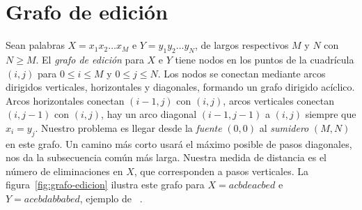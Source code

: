\section{Grafo de edición}
\label{sec:grafo-edicion}

  Sean palabras \(X = x_1 x_2 \ldots x_M\)
  e \(Y = y_1 y_2 \ldots y_N\),
  de largos respectivos \(M\) y \(N\) con \(N \ge M\).
  El \emph{grafo de edición}
  para \(X\) e \(Y\) tiene nodos en los puntos de la cuadrícula
  \((i, j)\) para \(0 \le i \le M\) y \(0 \le j \le N\).
  Los nodos se conectan mediante arcos dirigidos
  verticales, horizontales y diagonales,
  formando un grafo dirigido acíclico.
  Arcos horizontales conectan \((i - 1, j)\) con \((i, j)\),
  arcos verticales conectan \((i, j - 1)\) con \((i, j)\),
  hay un arco diagonal \((i - 1, j - 1)\) a \((i, j)\)
  siempre que \(x_i = y_j\).
  Nuestro problema es llegar desde la \emph{fuente} \((0, 0)\)
  al \emph{sumidero} \((M, N)\) en este grafo.
  Un camino más corto usará el máximo posible de pasos diagonales,
  nos da la subsecuencia común más larga.
  Nuestra medida de distancia es el número de eliminaciones en \(X\),
  que corresponden a pasos verticales.
  La figura~\ref{fig:grafo-edicion} ilustra este grafo
  para \(X = a c b d e a c b e d\)
  e \(Y = a c e b d a b b a b e d\),
  ejemplo de~%
    \cite{wu90:_sequence_comparison_algorithm}.
